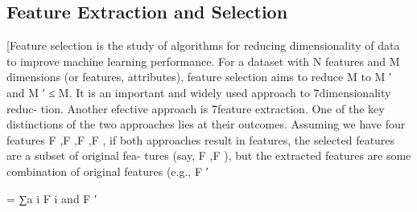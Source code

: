 	\subsection{Feature Extraction and Selection}


[Feature selection is the study of algorithms for reducing
dimensionality of data to improve machine learning
performance. 
For a dataset with N features and M
dimensions (or features, attributes), feature selection
aims to reduce M to M ′ and M ′ ≤ M. 
It is an important
and widely used approach to 7dimensionality reduc-
tion. Another efective approach is 7feature extraction.
One of the key distinctions of the two approaches lies
at their outcomes. 
Assuming we have four features
F  ,F  ,F  ,F  , if both approaches result in  features,
the  selected features are a subset of  original fea-
tures (say, F  ,F  ), but the  extracted features are some
combination of  original features (e.g., F ′

= ∑a i F i
and F ′

